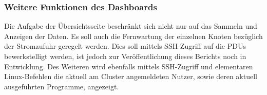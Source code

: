 \subsubsection{Weitere Funktionen des Dashboards}
Die Aufgabe der Übersichtsseite beschränkt sich nicht nur auf das Sammeln und Anzeigen der Daten. Es soll auch die Fernwartung der einzelnen Knoten bezüglich der Stromzufuhr geregelt werden. Dies soll mittels SSH-Zugriff auf die PDUs bewerkstelligt werden, ist jedoch zur Veröffentlichung dieses Berichts noch in Entwicklung.
Des Weiteren wird ebenfalls mittels SSH-Zugriff und elementaren Linux-Befehlen die aktuell am Cluster angemeldeten Nutzer, sowie deren aktuell ausgeführten Programme, angezeigt.
